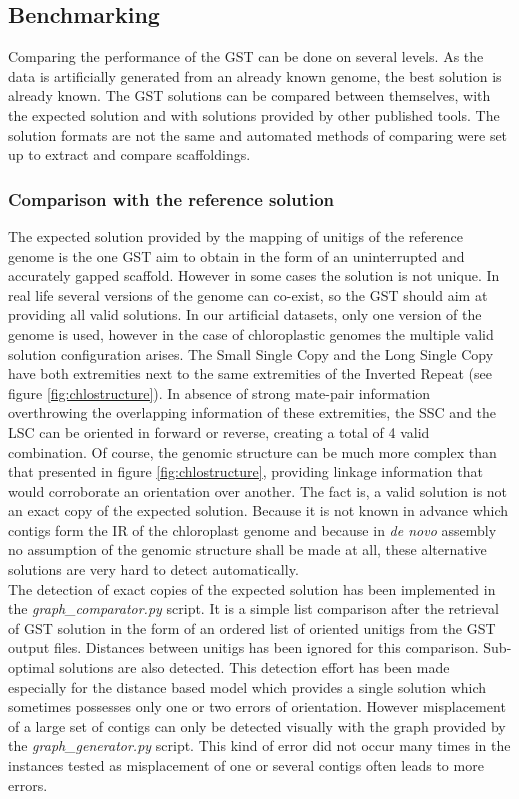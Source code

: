 \documentclass[12pt]{article}
\begin{document}
\subsection{Benchmarking} \label{sec:benchmarking}
Comparing the performance of the GST can be done on several levels. As the data is artificially generated from an already known genome, the best solution is already known. The GST solutions can be compared between themselves, with the expected solution and with solutions provided by other published tools. The solution formats are not the same and automated methods of comparing were set up to extract and compare scaffoldings. 

\subsubsection{Comparison with the reference solution}
The expected solution provided by the mapping of unitigs of the reference genome is the one GST aim to obtain in the form of an uninterrupted and accurately gapped scaffold. However in some cases the solution is not unique. In real life several versions of the genome can co-exist, so the GST should aim at providing all valid solutions. In our artificial datasets, only one version of the genome is used, however in the case of chloroplastic genomes the multiple valid solution configuration arises. The Small Single Copy and the Long Single Copy have both extremities next to the same extremities of the Inverted Repeat (see figure \ref{fig:chlostructure}). In absence of strong mate-pair information overthrowing the overlapping information of these extremities, the SSC and the LSC can be oriented in forward or reverse, creating a total of 4 valid combination. Of course, the genomic structure can be much more complex than that presented in figure \ref{fig:chlostructure}, providing linkage information that would corroborate an orientation over another. The fact is, a valid solution is not an exact copy of the expected solution. Because it is not known in advance which contigs form the IR of the chloroplast genome and because in \textit{de novo} assembly no assumption of the genomic structure shall be made at all, these alternative solutions are very hard to detect automatically. \\
The detection of exact copies of the expected solution has been implemented in the \textit{graph\_comparator.py} script. It is a simple list comparison after the retrieval of GST solution in the form of an ordered list of oriented unitigs from the GST output files. Distances between unitigs has been ignored for this comparison. Sub-optimal solutions are also detected. This detection effort has been made especially for the distance based model which provides a single solution which sometimes possesses only one or two errors of orientation. However misplacement of a large set of contigs can only be detected visually with the graph provided by the \textit{graph\_generator.py} script. This kind of error did not occur many times in the instances tested as misplacement of one or several contigs often leads to more errors.
\end{document}
